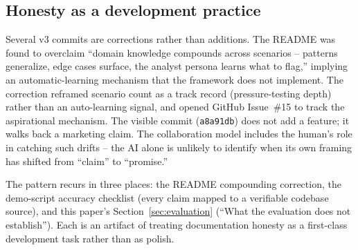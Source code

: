 \subsection{Honesty as a development practice}

Several v3 commits are corrections rather than additions. The README was found to overclaim ``domain knowledge compounds across scenarios -- patterns generalize, edge cases surface, the analyst persona learns what to flag,'' implying an automatic-learning mechanism that the framework does not implement. The correction reframed scenario count as a track record (pressure-testing depth) rather than an auto-learning signal, and opened GitHub Issue~\#15 to track the aspirational mechanism. The visible commit (\texttt{a8a91db}) does not add a feature; it walks back a marketing claim. The collaboration model includes the human's role in catching such drifts -- the AI alone is unlikely to identify when its own framing has shifted from ``claim'' to ``promise.''

The pattern recurs in three places: the README compounding correction, the demo-script accuracy checklist (every claim mapped to a verifiable codebase source), and this paper's Section~\ref{sec:evaluation} (``What the evaluation does not establish''). Each is an artifact of treating documentation honesty as a first-class development task rather than as polish.
